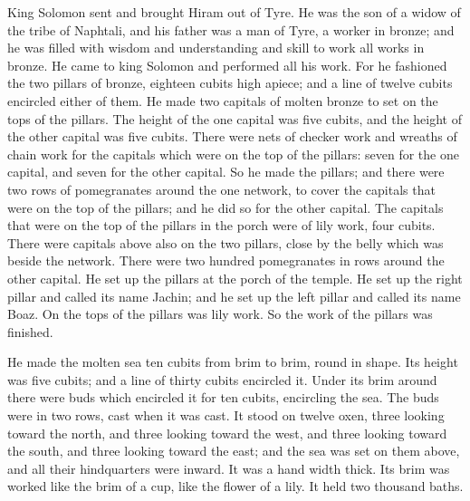  King Solomon sent and brought Hiram out of Tyre.
 He was the son of a widow of the tribe of Naphtali, and
his father was a man of Tyre, a worker in bronze; and he was filled with
wisdom and understanding and skill to work all works in bronze. He came
to king Solomon and performed all his work.  For he
fashioned the two pillars of bronze, eighteen cubits high apiece; and a
line of twelve cubits encircled either of them.  He made
two capitals of molten bronze to set on the tops of the pillars. The
height of the one capital was five cubits, and the height of the other
capital was five cubits.  There were nets of checker work
and wreaths of chain work for the capitals which were on the top of the
pillars: seven for the one capital, and seven for the other capital.
 So he made the pillars; and there were two rows of
pomegranates around the one network, to cover the capitals that were on
the top of the pillars; and he did so for the other capital.
 The capitals that were on the top of the pillars in the
porch were of lily work, four cubits.  There were capitals
above also on the two pillars, close by the belly which was beside the
network. There were two hundred pomegranates in rows around the other
capital.  He set up the pillars at the porch of the temple.
He set up the right pillar and called its name Jachin; and he set up the
left pillar and called its name Boaz.  On the tops of the
pillars was lily work. So the work of the pillars was finished.

 He made the molten sea ten cubits from brim to brim, round
in shape. Its height was five cubits; and a line of thirty cubits
encircled it.  Under its brim around there were buds which
encircled it for ten cubits, encircling the sea. The buds were in two
rows, cast when it was cast.  It stood on twelve oxen,
three looking toward the north, and three looking toward the west, and
three looking toward the south, and three looking toward the east; and
the sea was set on them above, and all their hindquarters were inward.
 It was a hand width thick. Its brim was worked like the
brim of a cup, like the flower of a lily. It held two thousand baths.

